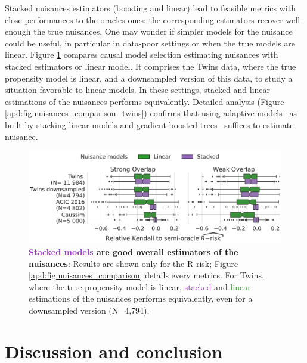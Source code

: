 \documentclass[a4paper,num-refs]{oup-contemporary}%
\begin{document}
Stacked nuisances estimators (boosting and linear) lead to feasible
metrics with close performances to the oracles ones: the
corresponding estimators recover well-enough the true nuisances.
One may wonder if simpler models for the nuisance could be useful,
in particular in data-poor settings or when the true models are linear.
Figure \ref{fig:all_datasets_nuisances_comparison} compares causal model
selection estimating nuisances with stacked estimators or linear model.
It comprises the Twins data, where the true propensity model is linear,
and a downsampled version of this data, to study a situation favorable to
linear models. In these settings,
stacked and linear estimations of the nuisances performs equivalently.
Detailed analysis (Figure \ref{apd:fig:nuisances_comparison_twins})
confirms that using adaptive models --as built by
stacking linear models and gradient-boosted trees-- suffices to estimate nuisance.

\begin{figure}[!tb]
    \centering\begin{minipage}{\linewidth}
        \includegraphics[width=\linewidth]{_4_nuisance_models_r_risk_3ds_2cols.pdf}
    \end{minipage}

    \caption{\textbf{\textcolor{DarkOrchid}{Stacked
                models} are good overall estimators of the nuisances}:
        Results are shown only for the
        R-risk; Figure \ref{apd:fig:nuisances_comparison}
        details every metrics. For Twins, where the true propensity
        model is linear, \textcolor{DarkOrchid}{stacked} and
        \textcolor{ForestGreen}{linear}
        estimations of the nuisances performs equivalently, even for a downsampled version
        (N=4,794). }\label{fig:all_datasets_nuisances_comparison}
\end{figure}




\section{Discussion and conclusion}\label{sec:discussion}\label{sec:conclusion}
\end{document}
